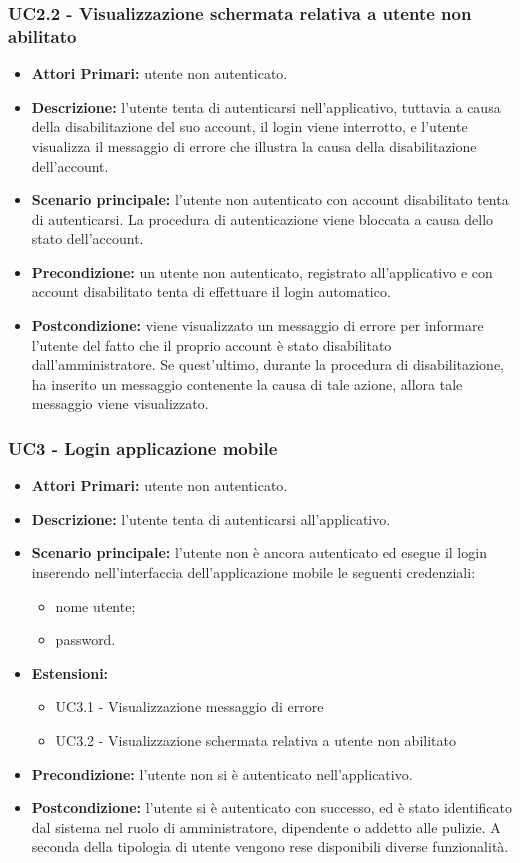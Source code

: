 \subsubsection{ UC2.2 - Visualizzazione schermata relativa a utente non abilitato}
\begin{itemize}
	\item\textbf{Attori Primari:} utente non autenticato.
	\item\textbf{Descrizione:} l'utente tenta di autenticarsi nell'applicativo, tuttavia a causa della disabilitazione del suo account, il login viene interrotto, e
	l'utente visualizza il messaggio di errore che illustra la causa della disabilitazione dell'account.
	\item\textbf{Scenario principale:} l’utente non autenticato con account disabilitato tenta di autenticarsi. 
	La procedura di autenticazione viene bloccata a causa dello stato dell'account.
	\item\textbf{Precondizione:} un utente non autenticato, registrato all'applicativo e con account disabilitato tenta di effettuare il login automatico. 
	\item\textbf{Postcondizione:} viene visualizzato un messaggio di errore per informare l'utente del fatto che il 
	proprio account è stato disabilitato dall'amministratore. Se quest'ultimo, durante la procedura di disabilitazione, ha inserito un messaggio contenente la causa di tale azione, allora tale messaggio viene visualizzato.
\end{itemize}

\subsubsection{ UC3 - Login applicazione mobile}
\begin{itemize}
	\item\textbf{Attori Primari:} utente non autenticato.
	\item\textbf{Descrizione:} l’utente tenta di autenticarsi all'applicativo.
	\item\textbf{Scenario principale:} l’utente non è ancora autenticato ed esegue il login inserendo nell'interfaccia dell'applicazione mobile le seguenti credenziali:
	\begin{itemize}
		\item nome utente;
		\item password.
	\end{itemize}
	\item\textbf{Estensioni:}
	\begin{itemize}
		\item UC3.1 - Visualizzazione messaggio di errore
		\item UC3.2 - Visualizzazione schermata relativa a utente non abilitato
	\end{itemize}
	\item\textbf{Precondizione:} l’utente non si è autenticato nell'applicativo. 
	\item\textbf{Postcondizione:} l’utente si è autenticato con successo, ed è stato identificato dal sistema
	nel ruolo di amministratore, dipendente o addetto alle pulizie. A seconda della tipologia di utente vengono rese
	disponibili diverse funzionalità.
\end{itemize}

